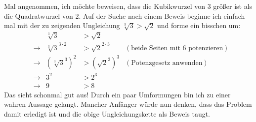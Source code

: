 \begin{bem} \label{hintennachvorne}
    Mal angenommen, ich möchte beweisen, dass die Kubikwurzel von $3$ größer ist als die Quadratwurzel von $2$. Auf der Suche nach einem Beweis beginne ich einfach mal mit der zu zeigenden Ungleichung $\sqrt[3]{3}>\sqrt{2}$ und forme ein bisschen um:
    \begin{align*}
        && \sqrt[3]{3}& >\sqrt{2} \\
        & \to& \sqrt[3]{3}^{3\cdot 2} & > \sqrt{2}^{2\cdot 3} & (\text{beide Seiten mit $6$ potenzieren}) \\
        & \to & (\sqrt[3]{3}^3)^2 & > (\sqrt{2}^2)^3 & (\text{Potenzgesetz anwenden})\\
        & \to & 3^2 & > 2^3 \\
        & \to & 9 & > 8
    \end{align*}
    Das sieht schonmal gut aus! Durch ein paar Umformungen bin ich zu einer wahren Aussage gelangt. Mancher Anfänger würde nun denken, dass das Problem damit erledigt ist und die obige Ungleichungskette als Beweis taugt.
    

\end{bem}

